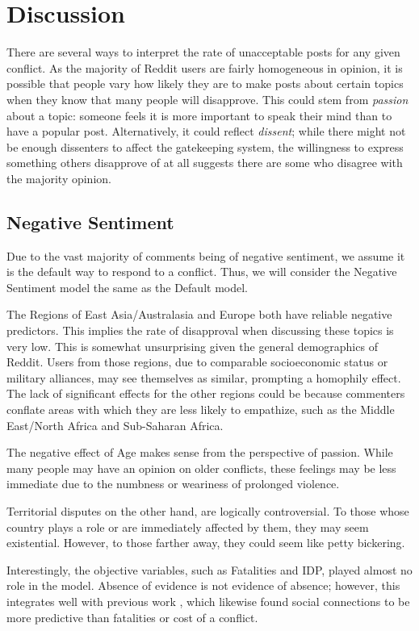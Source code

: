 \section{Discussion}
There are several ways to interpret the rate of unacceptable posts for any given conflict. As the majority of Reddit users are fairly homogeneous in opinion, it is possible that people vary how likely they are to make posts about certain topics when they know that many people will disapprove. This could stem from \textit{passion} about a topic: someone feels it is more important to speak their mind than to have a popular post. Alternatively, it could reflect \textit{dissent}; while there might not be enough dissenters to affect the gatekeeping system, the willingness to express something others disapprove of at all suggests there are some who disagree with the majority opinion. 

\subsection{Negative Sentiment}
Due to the vast majority of comments being of negative sentiment, we assume it is the default way to respond to a conflict. Thus, we will consider the Negative Sentiment model the same as the Default model.

The Regions of East Asia/Australasia and Europe both have reliable negative predictors. This implies the rate of disapproval when discussing these topics is very low. This is somewhat unsurprising given the general demographics of Reddit. Users from those regions, due to comparable socioeconomic status or military alliances, may see themselves as similar, prompting a homophily effect. The lack of significant effects for the other regions could be because commenters conflate areas with which they are less likely to empathize, such as the Middle East/North Africa and Sub-Saharan Africa.

The negative effect of Age makes sense from the perspective of passion. While many people may have an opinion on older conflicts, these feelings may be less immediate due to the numbness or weariness of prolonged violence.

Territorial disputes on the other hand, are logically controversial. To those whose country plays a role or are immediately affected by them, they may seem existential. However, to those farther away, they could seem like petty bickering.

Interestingly, the objective variables, such as Fatalities and IDP, played almost no role in the model. Absence of evidence is not evidence of absence; however, this integrates well with previous work \cite{Berinsky2009}, which likewise found social connections to be more predictive than fatalities or cost of a conflict.


